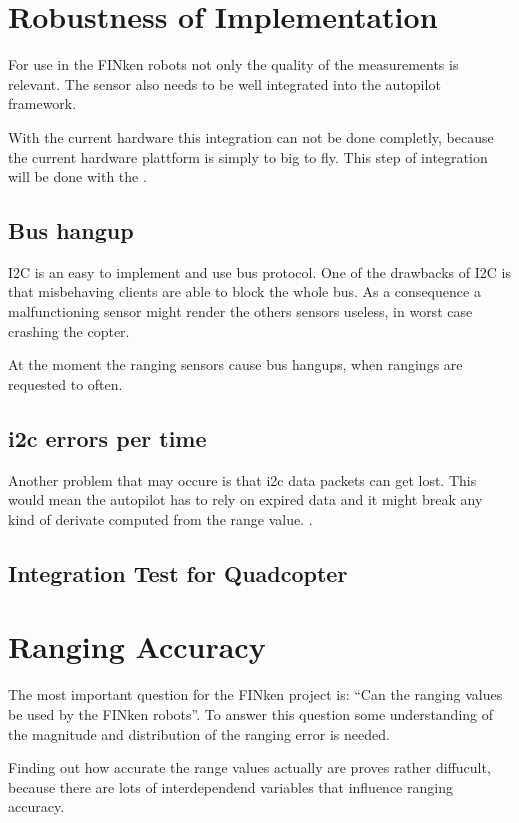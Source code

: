 
\section{Robustness of Implementation}

For use in the FINken robots not only the quality of the measurements is relevant.
The sensor also needs to be well integrated into the autopilot framework.

With the current hardware this integration can not be done completly, because the current hardware plattform is simply to big to fly.
This step of integration will be done with the .

\subsection{Bus hangup}
I2C is an easy to implement and use bus protocol.
One of the drawbacks of I2C is that misbehaving clients are able to block the whole bus.
As a consequence a malfunctioning sensor might render the others sensors useless, in worst case crashing the copter.

At the moment the ranging sensors cause bus hangups, when rangings are requested to often.

\subsection{i2c errors per time}
Another problem that may occure is that i2c data packets can get lost.
This would mean the autopilot has to rely on expired data and it might break any kind of derivate computed from the range value. .

\subsection{Integration Test for Quadcopter}


\section{Ranging Accuracy}

The most important question for the FINken project is: \enquote{Can the ranging values be used by the FINken robots}.
To answer this question some understanding of the magnitude and distribution of the ranging error is needed.

Finding out how accurate the range values actually are proves rather diffucult, because there are lots of interdependend variables that influence ranging accuracy.

